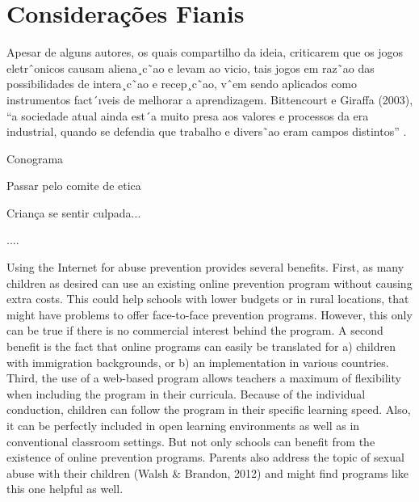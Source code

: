 \chapter{Considerações Fianis}\label{ch:Conclusao}


Apesar de alguns autores, os quais compartilho da ideia, criticarem que os jogos eletrˆonicos causam aliena¸c˜ao e levam ao vicio, tais jogos em raz˜ao das possibilidades de intera¸c˜ao e recep¸c˜ao, vˆem sendo aplicados como instrumentos fact´ıveis de melhorar a aprendizagem. %
Bittencourt e Giraffa (2003), “a sociedade atual ainda est´a muito presa aos valores e processos da era industrial, quando se defendia que trabalho e divers˜ao eram campos distintos” .

Conograma

Passar pelo comite de etica

Criança se sentir culpada...

....

Using the Internet for abuse prevention provides several benefits. First, as many children as desired can use an existing online prevention program without causing extra costs. This could help schools with lower budgets or in rural locations, that might have problems to offer face-to-face prevention programs. However, this only can be true if there is no commercial interest behind the program. A second benefit is the fact that online programs can easily be translated for a) children with immigration backgrounds, or b) an implementation in various countries. Third, the use of a web-based program allows teachers a maximum of flexibility when including the program in their curricula. Because of the individual conduction, children can follow the program in their specific learning speed. Also, it can be perfectly included in open learning environments as well as in conventional classroom settings. But not only schools can benefit from the existence of online prevention programs. Parents also address the topic of sexual abuse with their children (Walsh \& Brandon, 2012) and might find programs like this one helpful as well.\cite{muller2014child}


